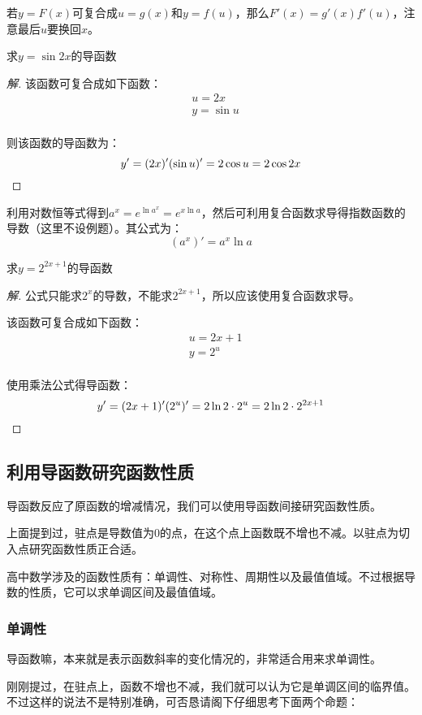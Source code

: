 若$y=F(x)$可复合成$u=g(x)$和$y=f(u)$，那么$F'(x)=g'(x)f'(u)$，注意最后$u$要换回$x$。

\begin{example}
	求$y=\sin2x$的导函数
\end{example}
\begin{proof}[解]
	该函数可复合成如下函数：
	\[\begin{aligned}
		&u=2x \\
		&y=\sin u \\
	\end{aligned}\]

	则该函数的导函数为：\[y'=(2x)'(\sin u)'=2\cos u=2\cos 2x\qedhere\]
\end{proof}

利用对数恒等式得到$a^x=e^{\ln a^x}=e^{x\ln a}$，然后可利用复合函数求导得指数函数的导数（这里不设例题）。其公式为：\[(a^x)'=a^x\ln a\]

\begin{example}
	求$y=2^{2x+1}$的导函数
\end{example}
\begin{proof}[解]
	公式只能求$2^x$的导数，不能求$2^{2x+1}$，所以应该使用复合函数求导。

	该函数可复合成如下函数：
	\[\begin{aligned}
		&u=2x+1 \\
		&y=2^u \\
	\end{aligned}\]

	使用乘法公式得导函数：\[y'=(2x+1)'(2^u)'=2\ln 2\cdot2^u=2\ln2\cdot2^{2x+1}\qedhere\]
\end{proof}

\subsection{利用导函数研究函数性质}
导函数反应了原函数的增减情况，我们可以使用导函数间接研究函数性质。

上面提到过，驻点是导数值为$0$的点，在这个点上函数既不增也不减。以驻点为切入点研究函数性质正合适。

高中数学涉及的函数性质有：单调性、对称性、周期性以及最值值域。不过根据导数的性质，它可以求单调区间及最值值域。

\subsubsection{单调性}
导函数嘛，本来就是表示函数斜率的变化情况的，非常适合用来求单调性。

刚刚提过，在驻点上，函数不增也不减，我们就可以认为它是单调区间的临界值。不过这样的说法不是特别准确，可否恳请阁下仔细思考下面两个命题：

